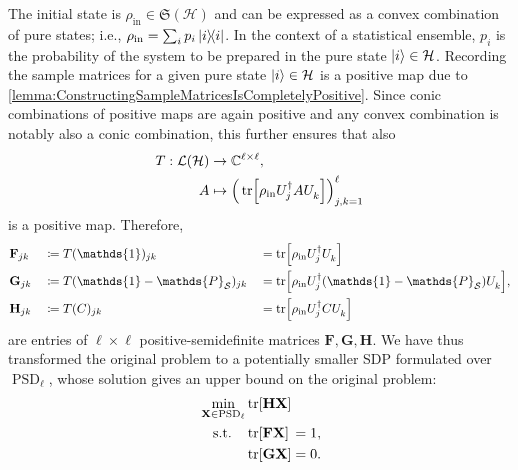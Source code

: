 \documentclass[10pt,conference]{IEEEtran}
\DeclareMathOperator{\PSD}{PSD}       %
\newcommand*{\C}{\mathbb{C}}          %
\newcommand*{\hil}{\mathcal{H}}       %
\newcommand*{\solspace}{\mathcal{S}}  %
\newcommand*{\one}{\mathds{1}}        %
\newcommand*{\projection}{\mathds{P}} %
\newcommand*{\lo}{\mathcal{L}}        %
\newcommand*{\mathhphantomdisplay}[2]{\mathmakebox[\widthof{$\displaystyle #1$}][l]{#2}}
\begin{document}
The initial state is $\rho_{\text{in}} \in \mathfrak{S}(\hil)$ and can be expressed as a convex combination of pure states; i.e., $\rho_{\text{in}} = \sum_{i} p_{i} \ketbra{i}{i}$.
In the context of a statistical ensemble, $p_{i}$ is the probability of the system to be prepared in the pure state $\ket{i} \in \hil$.
Recording the sample matrices for a given pure state $\ket{i} \in \hil$ is a positive map due to \autoref{lemma:ConstructingSampleMatricesIsCompletelyPositive}.
Since conic combinations of positive maps are again positive and any convex combination is notably also a conic combination, this further ensures that also
\begin{align}
    \begin{split}
        T : \lo(\hil) &\rightarrow \C^{\ell \times \ell}, \\
        A &\mapsto \Big(\tr[\rho_{\text{in}} U_{j}^{\dagger} A U_{k}^{\vphantom{\dagger}}]\Big)_{j, k = 1}^{\ell}
    \end{split}
\end{align}
is a positive map.
Therefore,
\begin{alignat*}{3}
    &\mathbf{F}_{j k} &&\coloneqq T(\one)_{j k} &&= \tr[\rho_{\text{in}} U_{j}^{\dag} U_{k}^{\vphantom{\dagger}}] \\
    &\mathbf{G}_{j k} &&\coloneqq T(\one - \projection_{\solspace})_{j k} &&= \tr[\rho_{\text{in}} U_{j}^{\dag} (\one - \projection_{\solspace}) U_{k}^{\vphantom{\dagger}}], \\
    &\mathbf{H}_{j k} &&\coloneqq T(C)_{j k} &&= \tr[\rho_{\text{in}} U_{j}^{\dag} C U_{k}^{\vphantom{\dagger}}]
\end{alignat*}
are entries of $\ell \times \ell$ positive-semidefinite matrices $\mathbf{F}, \mathbf{G}, \mathbf{H}$.
We have thus transformed the original problem to a potentially smaller SDP formulated over $\PSD_{\ell}$, whose solution gives an upper bound on the original problem:
\begin{equation}\label{equation:CCOPMomMatSDP}
    \begin{alignedat}{3}
        &\min_{\mathbf{X} \in \PSD_\ell} &&\tr[\mathbf{H} \mathbf{X}]
        \\
        & \quad \text{s.t.} &&\,\mathhphantomdisplay{\tr[\mathbf{G} \mathbf{X}]}{\tr[\mathbf{F} \mathbf{X}]} = 1,
        \\
        & &&\tr[\mathbf{G} \mathbf{X}] = 0.
    \end{alignedat}
\end{equation}
\end{document}
